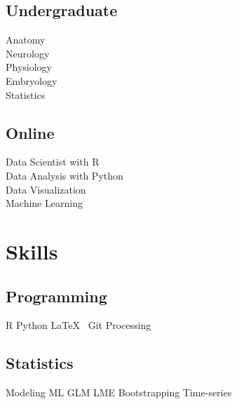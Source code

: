 \documentclass[]{deedy-resume-openfont}
\begin{document}
\begin{minipage}[t]{0.33\textwidth}
\subsection{Undergraduate}
Anatomy \\
Neurology \\
Physiology \\
Embryology \\
Statistics
\sectionsep

\subsection{Online}
Data Scientist with R \\
Data Analysis with Python \\
Data Visualization \\
Machine Learning
\sectionsep

\section{Skills}
\subsection{Programming}
R \textbullet{} Python \textbullet{} \LaTeX\ \textbullet{} Git \textbullet{} Processing
\sectionsep

\subsection{Statistics}
Modeling \textbullet{} ML \textbullet{} GLM \textbullet{} LME \textbullet{} Bootstrapping \textbullet{} Time-series

\end{minipage} 
\hfill
\end{document}
